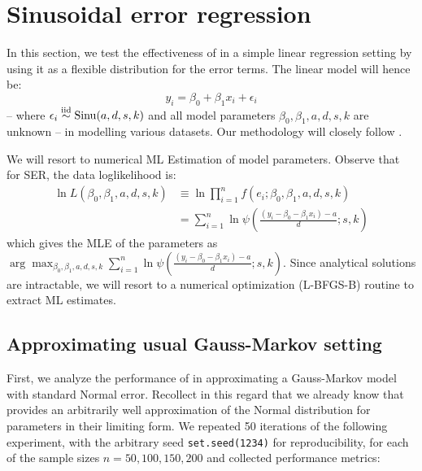 \section{Sinusoidal error regression}
In this section, we test the effectiveness of \sindist{} in a simple linear regression setting by using it as a flexible distribution for the error terms. The linear model will hence be:
\[y_i = \beta_0 + \beta_1 x_i + \epsilon_i\]
-- where $\epsilon_i \overset{\text{iid}}{\sim} \operatorname*{Sinu}(a,d,s,k)$ and all model parameters $\beta_0, \beta_1, a, d, s, k$ are unknown -- in modelling various datasets. Our methodology will closely follow \cite{dean2009versatile}.

We will resort to numerical ML Estimation of model parameters. Observe that for SER, the data loglikelihood is:
\begin{align*}
	\ln L(\beta_0, \beta_1, a,d,s,k) &\equiv \ln \prod_{i=1}^n f(e_i; \beta_0, \beta_1, a,d,s,k)\\
	&= \sum_{i=1}^n \ln \psi\left(\frac{(y_i - \beta_0 - \beta_1 x_i) -a}{d}; s,k\right)
\end{align*}
which gives the MLE of the parameters as $\arg \max_{\beta_0, \beta_1, a,d,s,k} \sum_{i=1}^n \ln \psi\left(\frac{(y_i - \beta_0 - \beta_1 x_i) -a}{d}; s,k\right)$. Since analytical solutions are intractable, we will resort to a numerical optimization (L-BFGS-B) routine to extract ML estimates.

\subsection{Approximating usual Gauss-Markov setting}
First, we analyze the performance of \sindist{} in approximating a Gauss-Markov model with standard Normal error. Recollect in this regard that we already know that \sindist{} provides an arbitrarily well approximation of the Normal distribution for parameters in their limiting form. We repeated 50 iterations of the following experiment, with the arbitrary seed \texttt{set.seed(1234)} for reproducibility, for each of the sample sizes $n = 50, 100, 150, 200$ and collected performance metrics:

